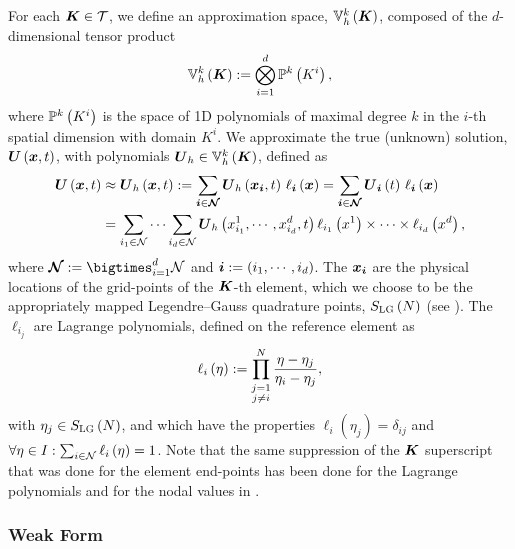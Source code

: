 For each $\boldsymbol{K}\in\mathcal{T}$, we define an approximation space,
$\mathbb{V}^{k}_{h}\left(\boldsymbol{K}\right)$,
composed of the $d$-dimensional tensor product
\begin{equation}
  \mathbb{V}^{k}_{h}\left(\boldsymbol{K}\right)
  :=\bigotimes\limits_{i=1}^{d}\mathbb{P}^{k}\left(K^{i}\right),
\end{equation}
where $\mathbb{P}^{k}\left(K^{i}\right)$ is
the space of 1D polynomials of maximal degree $k$ in the $i$-th spatial
dimension with domain $K^{i}$.
We approximate the true (unknown)
solution, $\boldsymbol{U}\left(\boldsymbol{x},t\right)$,
with polynomials $\boldsymbol{U}_{h}\in\mathbb{V}^{k}_{h}\left(\boldsymbol{K}\right)$,
defined as
\begin{align}
\begin{split}
  \boldsymbol{U}\left(\boldsymbol{x},t\right)
  &\approx\boldsymbol{U}_{h}\left(\boldsymbol{x},t\right)
  :=\sum\limits_{\boldsymbol{i}\in\boldsymbol{\mathcal{N}}}
  \boldsymbol{U}_{h}\left(\boldsymbol{x}_{\boldsymbol{i}},t\right)\,\ell_{\boldsymbol{i}}\left(\boldsymbol{x}\right)
  =\sum\limits_{\boldsymbol{i}\in\boldsymbol{\mathcal{N}}}
  \boldsymbol{U}_{\boldsymbol{i}}\left(t\right)\,\ell_{\boldsymbol{i}}\left(\boldsymbol{x}\right)\\
  &=\sum\limits_{i_{1}\in\mathcal{N}}\cdots\sum\limits_{i_{d}\in\mathcal{N}}
  \boldsymbol{U}_{h}\left(x^{1}_{i_{1}},\cdots,x^{d}_{i_{d}},t\right)
  \ell_{i_{1}}\left(x^{1}\right)\times\cdots\times
  \ell_{i_{d}}\left(x^{d}\right),
  \label{eq.nodalApprox}
\end{split}
\end{align}
where $\bc{N}:=\bigtimes_{i=1}^{d}\mc{N}$
and $\boldsymbol{i}:=\left(i_{1},\cdots,i_{d}\right)$.
The $\boldsymbol{x}_{\boldsymbol{i}}$ are the physical locations of the grid-points
of the $\boldsymbol{K}$-th element,
which we choose to be the appropriately mapped
Legendre--Gauss quadrature points, $S_{\textsc{LG}}\left(N\right)$
(see ).
The $\ell_{i_{j}}$ are Lagrange polynomials,
defined on the reference element as
\begin{equation}
  \ell_{i}\left(\eta\right)
  :=\prod\limits_{\stackrel{\scriptstyle j=1}{\scriptstyle j\neq i}}^{N}
  \frac{\eta-\eta_{j}}{\eta_{i}-\eta_{j}},
\end{equation}
with $\eta_{j}\in S_{\textsc{LG}}\left(N\right)$,
and which have the properties
$\ell_{i}\left(\eta_{j}\right)=\delta_{ij}$
and $\forall\eta\in I:\sum_{i\in\mathcal{N}}\ell_{i}\left(\eta\right)=1$.
Note that the same suppression of the $\boldsymbol{K}$ superscript that was done for
the element end-points has been
done for the Lagrange polynomials and for the nodal values
in .

\subsubsection{Weak Form}

